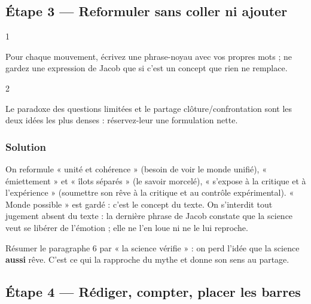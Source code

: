 \documentclass[11pt,a4paper]{article}
\begin{document}
\hypertarget{uxe9tape-3-reformuler-sans-coller-ni-ajouter}{%
\subsection{Étape 3 --- Reformuler sans coller ni ajouter}\label{uxe9tape-3-reformuler-sans-coller-ni-ajouter}}

\begin{indication}{1}

Pour chaque mouvement, écrivez une phrase-noyau avec vos propres mots ; ne gardez une expression de Jacob que si c'est un concept que rien ne remplace.

\end{indication}

\begin{indication}{2}

Le paradoxe des questions limitées et le partage clôture/confrontation sont les deux idées les plus denses : réservez-leur une formulation nette.

\end{indication}

\hypertarget{solution-2}{%
\subsubsection{Solution}\label{solution-2}}

On reformule « unité et cohérence » (besoin de voir le monde unifié), « émiettement » et « îlots séparés » (le savoir morcelé), « s'expose à la critique et à l'expérience » (soumettre son rêve à la critique et au contrôle expérimental). « Monde possible » est gardé : c'est le concept du texte. On s'interdit tout jugement absent du texte : la dernière phrase de Jacob constate que la science veut se libérer de l'émotion ; elle ne l'en loue ni ne le lui reproche.

\begin{piege}

Résumer le paragraphe 6 par « la science vérifie » : on perd l'idée que la science \textbf{aussi} rêve. C'est ce qui la rapproche du mythe et donne son sens au partage.

\end{piege}

\hypertarget{uxe9tape-4-ruxe9diger-compter-placer-les-barres}{%
\subsection{Étape 4 --- Rédiger, compter, placer les barres}\label{uxe9tape-4-ruxe9diger-compter-placer-les-barres}}
\end{document}
